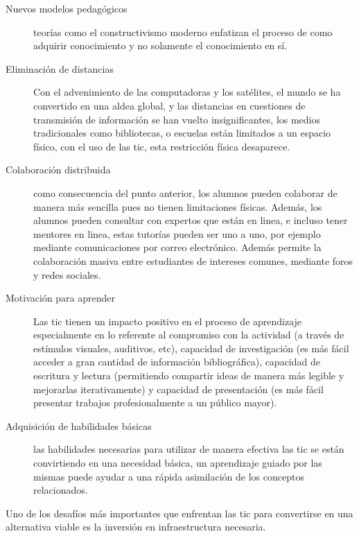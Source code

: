 \begin{description}

    \item[Nuevos modelos pedagógicos] teorías como el constructivismo moderno
	    enfatizan el proceso de como adquirir conocimiento y no solamente el
	    conocimiento en sí.

    \item[Eliminación de distancias] Con el advenimiento de las computadoras y los
	    satélites, el mundo se ha convertido en una aldea global, y las
	    distancias en cuestiones de transmisión de información se han vuelto
	    insignificantes\cite{mohammed2013information}, los medios
	    tradicionales como bibliotecas, o escuelas están limitados a un
	    espacio físico, con el uso de las \Gls{tic}, esta restricción
	    física desaparece\cite{tinio:ict}.

    \item[Colaboración distribuida] como consecuencia del punto anterior, los
	    alumnos pueden colaborar de manera más sencilla pues no tienen
	    limitaciones físicas. Además, los alumnos pueden consultar con
	    expertos que están en linea, e incluso tener mentores en linea,
	    estas tutorías pueden ser uno a uno, por ejemplo mediante
	    comunicaciones por correo electrónico. Además permite la
	    colaboración masiva entre estudiantes de intereses comunes, mediante
	    foros y redes sociales\cite{unesco:ict}.

    \item[Motivación para aprender] Las \Gls{tic} tienen un impacto positivo en
	    el proceso de aprendizaje especialmente en lo referente al
	    compromiso con la actividad (a través de estímulos visuales,
	    auditivos, etc), capacidad de investigación (es más fácil acceder a
	    gran cantidad de información bibliográfica), capacidad de escritura
	    y lectura (permitiendo compartir ideas de manera más legible y
	    mejorarlas iterativamente) y capacidad de presentación (es más fácil
	    presentar trabajos profesionalmente a un público
	    mayor)\cite{passey2004motivational}\cite{egenfeldt2007third}.

    \item[Adquisición de habilidades básicas] las habilidades necesarias para
	    utilizar de manera efectiva las \Gls{tic} se están convirtiendo en
	    una necesidad básica, un aprendizaje guiado por las mismas puede
	    ayudar a una rápida asimilación de los conceptos relacionados.

\end{description}

Uno de los desafíos más importantes que enfrentan las \Gls{tic} para convertirse
en una alternativa viable es la inversión en infraestructura
necesaria\cite{unesco:ict}. 



%
 


